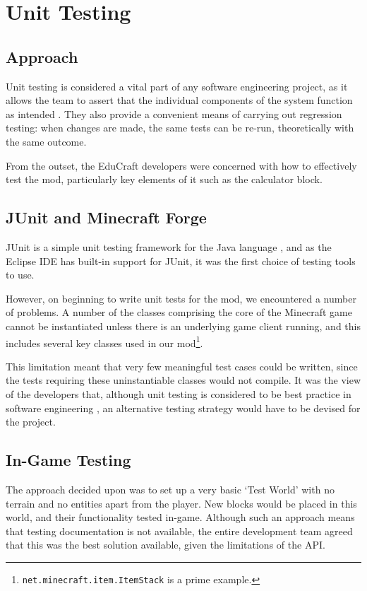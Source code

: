 \chapter{Unit Testing}
\label{apdx:unit-tests}

\section{Approach}
Unit testing is considered a vital part of any software engineering
project, as it allows the team to assert that the individual components
of the system function as intended \cite{sommerville11}. They also
provide a convenient means of carrying out regression testing: when
changes are made, the same tests can be re-run, theoretically with the
same outcome.

From the outset, the EduCraft developers were concerned with how to
effectively test the mod, particularly key elements of it such as the
calculator block.

\section{JUnit and Minecraft Forge}
JUnit is a simple unit testing framework for the Java language \cite{website:junit},
and as the Eclipse IDE has built-in support for JUnit, it was the first choice
of testing tools to use.

However, on beginning to write unit tests for the mod, we encountered
a number of problems. A number of the classes comprising the core of
the Minecraft game cannot be instantiated unless there is an underlying
game client running, and this includes several key classes used in
our mod\footnote{\texttt{net.minecraft.item.ItemStack} is a prime
example.}.

This limitation meant that very few meaningful test cases could be written,
since the tests requiring these uninstantiable classes would not
compile. It was the view of the developers that, although unit testing is
considered to be best practice in software engineering \cite{sommerville11},
an alternative testing strategy would have to be devised for the project.

\section{In-Game Testing}
The approach decided upon was to set up a very basic `Test World'
with no terrain and no entities apart from the player. New blocks would
be placed in this world, and their functionality tested in-game.
Although such an approach means that testing documentation is
not available, the entire development team agreed that this was the
best solution available, given the limitations of the API.
